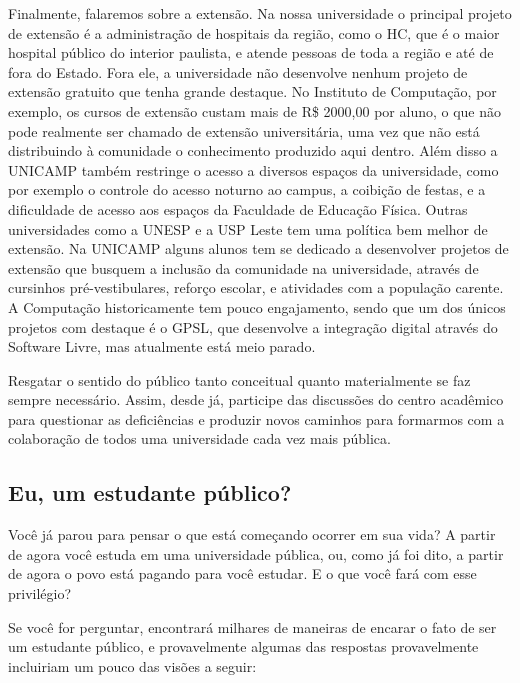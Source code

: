 \documentclass[a4paper,10pt, twocolumn]{article}
\begin{document}
Finalmente, falaremos sobre a extensão. Na nossa universidade o principal
projeto de extensão é a administração de hospitais da região, como o HC, que
é o maior hospital público do interior paulista, e atende pessoas de toda
a região e até de fora do Estado. Fora ele, a universidade não desenvolve nenhum
projeto de extensão gratuito que tenha grande destaque. No Instituto de
Computação, por exemplo, os cursos de extensão custam mais de R\$ 2000,00 por
aluno, o que não pode realmente ser chamado de extensão universitária, uma vez
que não está distribuindo à comunidade o conhecimento produzido aqui dentro.
Além disso a UNICAMP também restringe o acesso a diversos espaços da
universidade, como por exemplo o controle do acesso noturno ao campus,
a coibição de festas, e a dificuldade de acesso aos espaços da Faculdade de
Educação Física. Outras universidades como a UNESP e a USP Leste tem uma
política bem melhor de extensão. Na UNICAMP alguns alunos tem se dedicado
a desenvolver projetos de extensão que busquem a inclusão da comunidade na
universidade, através de cursinhos pré-vestibulares, reforço escolar,
e atividades com a população carente. A Computação historicamente tem pouco
engajamento, sendo que um dos únicos projetos com destaque é o GPSL, que
desenvolve a integração digital através do Software Livre, mas atualmente está
meio parado.

Resgatar o sentido do público tanto conceitual quanto materialmente se faz
sempre necessário. Assim, desde já, participe das discussões do centro acadêmico
para questionar as deficiências e produzir novos caminhos para formarmos com
a colaboração de todos uma universidade cada vez mais pública.

\subsection{Eu, um estudante público?} Você já parou para pensar o que está
começando ocorrer em sua vida? A partir de agora você estuda em uma universidade
pública, ou, como já foi dito, a partir de agora o povo está pagando para você
estudar. E o que você fará com esse privilégio?

Se você for perguntar, encontrará milhares de maneiras de encarar o fato de ser
um estudante público, e provavelmente algumas das respostas provavelmente
incluiriam um pouco das visões a seguir:
\end{document}
